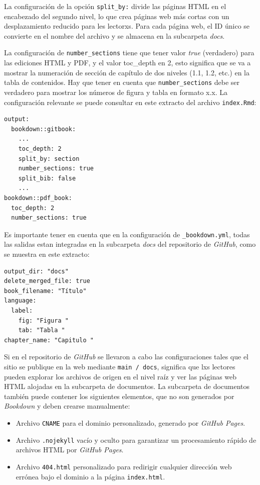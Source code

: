 \documentclass[
]{krantz}
\begin{document}
La configuración de la opción \texttt{split\_by:} divide las páginas HTML en el encabezado del segundo nivel, lo que crea páginas web más cortas con un desplazamiento reducido para les lectorxs. Para cada página web, el ID único se convierte en el nombre del archivo y se almacena en la subcarpeta \emph{docs}.

La configuración de \texttt{number\_sections} tiene que tener valor \emph{true} (verdadero) para las ediciones HTML y PDF, y el valor toc\_depth en 2, esto significa que se va a mostrar la numeración de sección de capítulo de dos niveles (1.1, 1.2, etc.) en la tabla de contenidos. Hay que tener en cuenta que \texttt{number\_sections} debe ser verdadero para mostrar los números de figura y tabla en formato x.x. La configuración relevante se puede consultar en este extracto del archivo \texttt{index.Rmd}:

\begin{verbatim}
output:
  bookdown::gitbook:
    ...
    toc_depth: 2
    split_by: section
    number_sections: true
    split_bib: false
    ...
bookdown::pdf_book:
  toc_depth: 2
  number_sections: true
\end{verbatim}

Es importante tener en cuenta que en la configuración de \texttt{\_bookdown.yml}, todas las salidas estan integradas en la subcarpeta \emph{docs} del repositorio de \emph{GitHub}, como se muestra en este extracto:

\begin{verbatim}
output_dir: "docs"
delete_merged_file: true
book_filename: "Título"
language:
  label:
    fig: "Figura "
    tab: "Tabla "
chapter_name: "Capitulo "
\end{verbatim}

Si en el repositorio de \emph{GitHub} se llevaron a cabo las configuraciones tales que el sitio se publique en la web mediante \texttt{main\ /\ docs}, significa que lxs lectores pueden explorar los archivos de origen en el nivel raíz y ver las páginas web HTML alojadas en la subcarpeta de documentos. La subcarpeta de documentos también puede contener los siguientes elementos, que no son generados por \emph{Bookdown} y deben crearse manualmente:

\begin{itemize}
\item
  Archivo \texttt{CNAME} para el dominio personalizado, generado por \emph{GitHub Pages}.
\item
  Archivo \texttt{.nojekyll} vacío y oculto para garantizar un procesamiento rápido de archivos HTML por \emph{GitHub Pages}.
\item
  Archivo \texttt{404.html} personalizado para redirigir cualquier dirección web errónea bajo el dominio a la página \texttt{index.html}.
\end{itemize}
\end{document}
